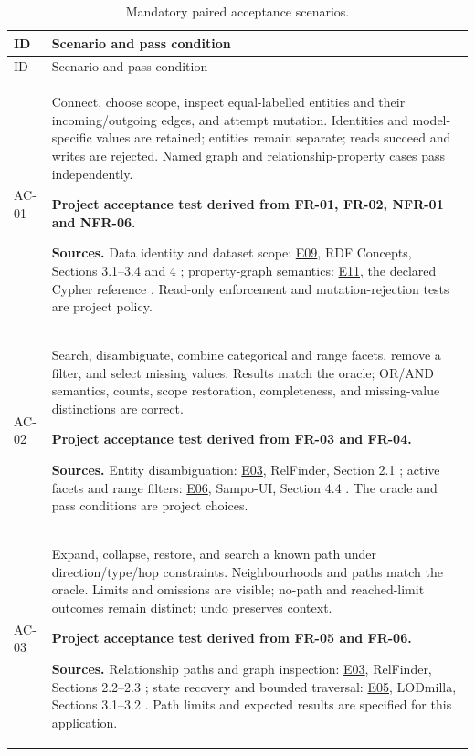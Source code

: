 \documentclass[11pt,a4paper]{article}
\newcommand{\evidence}[1]{\hyperlink{evidence:#1}{#1}}
\begin{document}
{\small
\begin{longtable}{@{}P{1.35cm}P{14.35cm}@{}}
\caption{Mandatory paired acceptance scenarios.}\label{tab:ac}\\
\toprule ID & Scenario and pass condition\\\midrule
\endfirsthead\toprule ID & Scenario and pass condition\\\midrule\endhead
\bottomrule\endlastfoot
AC-01 & Connect, choose scope, inspect equal-labelled entities and their incoming/outgoing edges, and attempt mutation. Identities and model-specific values are retained; entities remain separate; reads succeed and writes are rejected. Named graph and relationship-property cases pass independently.\par\smallskip \textbf{Project acceptance test derived from FR-01, FR-02, NFR-01 and NFR-06.}\par\smallskip \textbf{Sources.} Data identity and dataset scope: \evidence{E09}, RDF Concepts, Sections 3.1--3.4 and 4 \citep{rdfconcepts}; property-graph semantics: \evidence{E11}, the declared Cypher reference \citep{opencypher}. Read-only enforcement and mutation-rejection tests are project policy.\\
AC-02 & Search, disambiguate, combine categorical and range facets, remove a filter, and select missing values. Results match the oracle; OR/AND semantics, counts, scope restoration, completeness, and missing-value distinctions are correct.\par\smallskip \textbf{Project acceptance test derived from FR-03 and FR-04.}\par\smallskip \textbf{Sources.} Entity disambiguation: \evidence{E03}, RelFinder, Section 2.1 \citep{relfinder}; active facets and range filters: \evidence{E06}, Sampo-UI, Section 4.4 \citep{sampoui}. The oracle and pass conditions are project choices.\\
AC-03 & Expand, collapse, restore, and search a known path under direction/type/hop constraints. Neighbourhoods and paths match the oracle. Limits and omissions are visible; no-path and reached-limit outcomes remain distinct; undo preserves context.\par\smallskip \textbf{Project acceptance test derived from FR-05 and FR-06.}\par\smallskip \textbf{Sources.} Relationship paths and graph inspection: \evidence{E03}, RelFinder, Sections 2.2--2.3 \citep{relfinder}; state recovery and bounded traversal: \evidence{E05}, LODmilla, Sections 3.1--3.2 \citep{lodmilla}. Path limits and expected results are specified for this application.\\

\end{longtable}}
\end{document}
